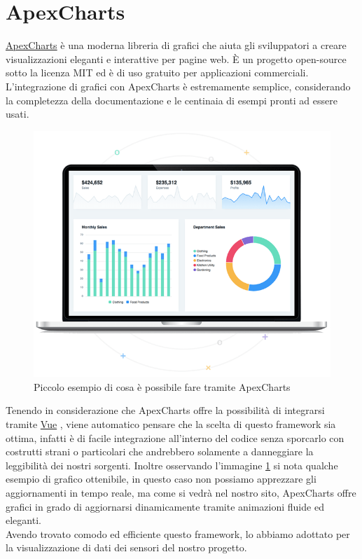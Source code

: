 \documentclass[a4paper,12pt]{report}
\newcommand{\vue}{\href{https://vuejs.org/}{Vue} }
\newcommand{\apexcharts}{\href{https://apexcharts.com/}{ApexCharts} }
\begin{document}
\section{ApexCharts}
\apexcharts è una moderna libreria di grafici che aiuta gli sviluppatori a creare visualizzazioni eleganti e interattive per pagine web. È un progetto open-source sotto la licenza MIT ed è di uso gratuito per applicazioni commerciali.\\
L'integrazione di grafici con ApexCharts è estremamente semplice, considerando la completezza della documentazione e le centinaia di esempi pronti ad essere usati.\\
\begin{figure}[h!]
    \centering
    \includegraphics[scale=0.7]{apexchart.png}
    \caption{Piccolo esempio di cosa è possibile fare tramite ApexCharts}
    \label{fig:apexchart}
\end{figure}

Tenendo in considerazione che ApexCharts offre la possibilità di integrarsi tramite \vue, viene automatico pensare che la scelta di questo framework sia ottima, infatti è di facile integrazione all'interno del codice senza sporcarlo con costrutti strani o particolari che andrebbero solamente a danneggiare la leggibilità dei nostri sorgenti. Inoltre osservando l'immagine \ref{fig:apexchart} si nota qualche esempio di grafico ottenibile, in questo caso non possiamo apprezzare gli aggiornamenti in tempo reale, ma come si vedrà nel nostro sito, ApexCharts offre grafici in grado di aggiornarsi dinamicamente tramite animazioni fluide ed eleganti.\\
Avendo trovato comodo ed efficiente questo framework, lo abbiamo adottato per la visualizzazione di dati dei sensori del nostro progetto.
\end{document}
